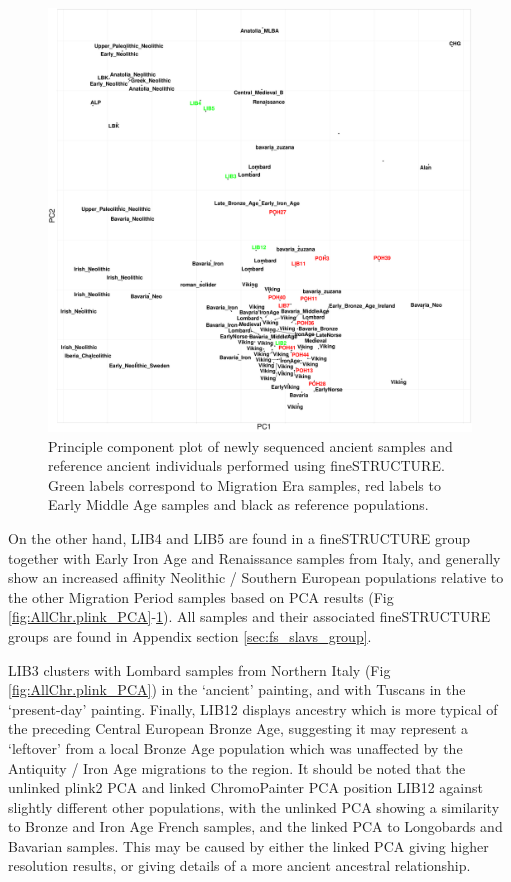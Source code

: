 \begin{figure}[htp]
    \centering
    \includegraphics[width=1.0\textwidth]{../images/chapter5/fs_PCA.pdf}
    \caption{Principle component plot of newly sequenced ancient samples and reference ancient individuals performed using fineSTRUCTURE. Green labels correspond to Migration Era samples, red labels to Early Middle Age samples and black as reference populations.}
    \label{fig:fs_PCA}
\end{figure}

On the other hand, LIB4 and LIB5 are found in a fineSTRUCTURE group together with Early Iron Age and Renaissance samples from Italy, and generally show an increased affinity Neolithic / Southern European populations relative to the other Migration Period samples based on PCA results (Fig \ref{fig:AllChr.plink_PCA}-\ref{fig:fs_PCA}). All samples and their associated fineSTRUCTURE groups are found in Appendix section \ref{sec:fs_slavs_group}. 

LIB3 clusters with Lombard samples from Northern Italy (Fig \ref{fig:AllChr.plink_PCA}) in the `ancient' painting, and with Tuscans in the `present-day' painting. Finally, LIB12 displays ancestry which is more typical of the preceding Central European Bronze Age, suggesting it may represent a `leftover' from a local Bronze Age population which was unaffected by the Antiquity / Iron Age migrations to the region. It should be noted that the unlinked plink2 PCA and linked ChromoPainter PCA position LIB12 against slightly different other populations, with the unlinked PCA showing a similarity to Bronze and Iron Age French samples, and the linked PCA to Longobards and Bavarian samples. This may be caused by either the linked PCA giving higher resolution results, or giving details of a more ancient ancestral relationship.  

